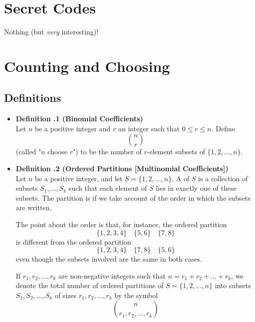 \documentclass[a4paper,12pt]{article}
\newcommand{\defi}[1]{
    \item \textbf{Definition \thesection.#1}\\
}
\let\emph\relax %
\begin{document}
\section{Secret Codes}
Nothing (but \textit{very} interesting)!

\section{Counting and Choosing}
\subsection{Definitions}
\begin{itemize}
    \defi {1 (Binomial Coefficients)}
    Let $n$ be a positive integer and $r$ an integer such that $0 \le r \le n$.
    Define
        $$ \binom{n}{r} $$
    (called "$n$ choose $r$") to be the number of $r$-element subsets of
    $\{1,2,\ldots,n\}$.
    
    \defi{2 (Ordered Partitions [Multinomial Coefficients])}
    Let $n$ be a positive integer, and let $S = \{1, 2, \ldots, n\}$. A
    \emph{partition} of $S$ is a collection of subsets $S_1, \ldots, S_k$ such
    that each element of $S$ lies in exactly one of these subsets. The
    partition is \emph{ordered} if we take account of the order in which the
    subsets are written.
    
    The point about the order is that, for instance, the ordered partition
        $$ \{1, 2, 3, 4\} \quad \{5, 6\} \quad \{7, 8\} $$
    is different from the ordered partition
        $$ \{1, 2, 3, 4\} \quad \{7, 8\} \quad \{5, 6\} $$
    even though the subsets involved are the same in both cases.
    
    If $r_1,r_2, \ldots, r_k $ are non-negative integers such that
    $n = r_1 + r_2 + \ldots + r_k$, we denote the total number of ordered
    partitions of $S = \{1, 2, \ldots, n\}$ into subsets
    $S_1, S_2, \ldots, S_k$ of sizes $r_1, r_2, \ldots, r_k$ by the symbol
        $$ \binom{n}{r_1, r_2, \ldots, r_k} $$
\end{itemize}
\end{document}
